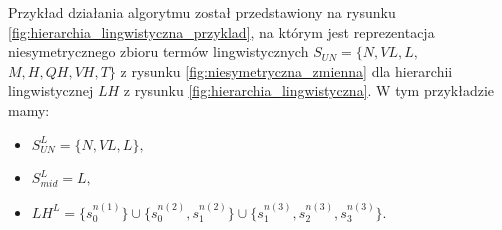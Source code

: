 Przykład działania algorytmu został przedstawiony na rysunku
\ref{fig:hierarchia_lingwistyczna_przyklad}, na którym jest reprezentacja
niesymetrycznego zbioru termów lingwistycznych $S_{UN} = \{ N, VL, L,$ $M, H, 
QH, VH, T \}$ z rysunku \ref{fig:niesymetryczna_zmienna} dla hierarchii
lingwistycznej $LH$ z rysunku \ref{fig:hierarchia_lingwistyczna}.
W tym przykładzie mamy:
\begin{itemize}
  \item $S^L_{UN} = \{N,VL,L\},$
  \item $S^L_{mid} = L,$
  \item $LH^L = \{s_0^{n(1)}\} \cup \{s_0^{n(2)}, s_1^{n(2)}\} \cup
  \{s_1^{n(3)}, s_2^{n(3)}, s_3^{n(3)}\}.$
\end{itemize}
